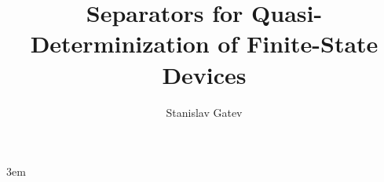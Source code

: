 \documentclass[12pt,a4paper]{report}
\title{Separators for Quasi-Determinization of Finite-State Devices}
\author{Stanislav Gatev}
\theoremstyle{definition}
\begin{document}
  \emergencystretch 3em
  
\end{document}
